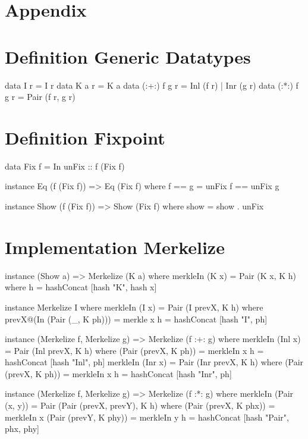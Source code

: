 \section{Appendix}
\appendix

\section{Definition Generic Datatypes}
\label{app-def-generic-datatypes}
\begin{haskell}
data I r         = I r                  
data K a r       = K a                  
data (:+:) f g r = Inl (f r) | Inr (g r)
data (:*:) f g r = Pair (f r, g r)      
\end{haskell}

\section{Definition Fixpoint}
\label{app-def-fixpoint}
\begin{haskell}
data Fix f = In { unFix :: f (Fix f) }

instance Eq (f (Fix f)) => Eq (Fix f) where
    f == g = unFix f == unFix g

instance Show (f (Fix f)) => Show (Fix f) where
    show = show . unFix
\end{haskell}

\section{Implementation Merkelize}
\label{app-impl-merkelize}
\begin{haskell}
instance (Show a) => Merkelize (K a) where
  merkleIn (K x) = Pair (K x, K h)
    where
      h = hashConcat [hash "K", hash x]

instance Merkelize I where
  merkleIn (I x) = Pair (I prevX, K h)
    where
      prevX@(In (Pair (_, K ph))) = merkle x
      h = hashConcat [hash "I", ph]

instance (Merkelize f, Merkelize g) => Merkelize (f :+: g) where
  merkleIn (Inl x) = Pair (Inl prevX, K h)
    where
      (Pair (prevX, K ph)) = merkleIn x
      h = hashConcat [hash "Inl", ph]
  merkleIn (Inr x) = Pair (Inr prevX, K h)
    where
      (Pair (prevX, K ph)) = merkleIn x
      h = hashConcat [hash "Inr", ph]

instance (Merkelize f, Merkelize g) => Merkelize (f :*: g) where
  merkleIn (Pair (x, y)) = Pair (Pair (prevX, prevY), K h)
    where
      (Pair (prevX, K phx)) = merkleIn x
      (Pair (prevY, K phy)) = merkleIn y
      h = hashConcat [hash "Pair", phx, phy]
\end{haskell}


